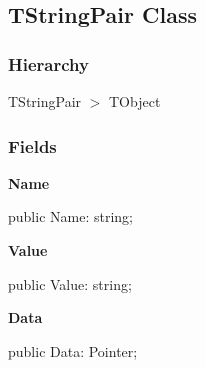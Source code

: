 \documentclass{report}
\newif\ifpdf
\begin{document}
\subsection*{TStringPair Class}
\fi
\label{PasDoc_StringPairVector.TStringPair}
\subsubsection*{\large{\textbf{Hierarchy}}\normalsize\hspace{1ex}\hfill}
TStringPair {$>$} TObject
\subsubsection*{\large{\textbf{Fields}}\normalsize\hspace{1ex}\hfill}
\begin{list}{}{
\setlength{\itemindent}{0cm}
\setlength{\listparindent}{0cm}
\setlength{\leftmargin}{\evensidemargin}
\addtolength{\leftmargin}{\tmplength}
\settowidth{\labelsep}{X}
\addtolength{\leftmargin}{\labelsep}
\setlength{\labelwidth}{\tmplength}
}
\label{PasDoc_StringPairVector.TStringPair-Name}
\item[\textbf{Name}\hfill]
\ifpdf
\begin{flushleft}
\fi
\begin{ttfamily}
public Name: string;\end{ttfamily}

\ifpdf
\end{flushleft}
\fi


\par  \label{PasDoc_StringPairVector.TStringPair-Value}
\item[\textbf{Value}\hfill]
\ifpdf
\begin{flushleft}
\fi
\begin{ttfamily}
public Value: string;\end{ttfamily}

\ifpdf
\end{flushleft}
\fi


\par  \label{PasDoc_StringPairVector.TStringPair-Data}
\item[\textbf{Data}\hfill]
\ifpdf
\begin{flushleft}
\fi
\begin{ttfamily}
public Data: Pointer;\end{ttfamily}

\ifpdf
\end{flushleft}
\fi


\par  \end{list}
\end{document}
